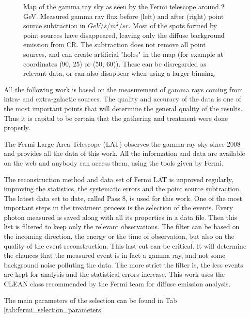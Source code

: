 \begin{figure}[h]
\begin{minipage}[h]{0.45\textwidth}
	  \subcaption{}
	  \label{fig:data_ptsrc_subtracted}
  \end{minipage}
  \caption[Gamma-ray sky by Fermi.]{Map of the gamma ray sky as seen by the Fermi telescope around 2 GeV. Measured gamma ray flux before (left) and after (right) point source subtraction in $GeV/s/m^2/sr$. Most of the spots formed by point sources have disappeared, leaving only the diffuse background emission from CR. The subtraction does not remove all point sources, and can create artificial "holes" in the map (for example at coordinates (90, 25) or (50, 60)). These can be disregarded as relevant data, or can also disappear when using a larger binning.}
  \label{fig:method_pass8} 
\end{figure}

All the following work is based on the measurement of gamma rays coming from intra- and extra-galactic sources. The quality and accuracy of the data is one of the most important points that will determine the general quality of the results. Thus it is capital to be certain that the gathering and treatment were done properly.

The Fermi Large Area Telescope (LAT) observes the gamma-ray sky since 2008 and provides all the data of this work. \cite{Fermi2009}
All the information and data are available on the web and anybody can access them, using the tools given by Fermi. \cite{FermiTools}

The reconstruction method and data set of Fermi LAT is improved regularly, improving the statistics, the systematic errors and the point source subtraction. The latest data set to date, called Pass 8, is used for this work.
One of the most important steps in the treatment process is the selection of the events. Every photon measured is saved along with all its properties in a data file. Then this list is filtered to keep only the relevant observations. The filter can be based on the incoming direction, the energy or the time of observation, but also on the quality of the event reconstruction. This last cut can be critical. It will determine the chances that the measured event is in fact a gamma ray, and not some background noise polluting the data. The more strict the filter is, the less events are kept for analysis and the statistical errors increase. This work uses the CLEAN class recommended by the Fermi team for diffuse emission analysis. \cite{FermiTools}

The main parameters of the selection can be found in Tab \ref{tab:fermi_selection_parameters}.

